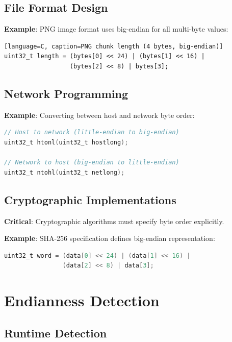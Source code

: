 \documentclass[11pt,a4paper]{article}
\begin{document}
\subsection{File Format Design}

\textbf{Example}: PNG image format uses big-endian for all multi-byte values:

\begin{lstlisting}[language=C, caption=PNG chunk length (4 bytes, big-endian)]
uint32_t length = (bytes[0] << 24) | (bytes[1] << 16) | 
                  (bytes[2] << 8) | bytes[3];
\end{lstlisting}

\subsection{Network Programming}

\textbf{Example}: Converting between host and network byte order:

\begin{lstlisting}[language=C, caption=Host and Network Byte Order Functions]
// Host to network (little-endian to big-endian)
uint32_t htonl(uint32_t hostlong);

// Network to host (big-endian to little-endian)
uint32_t ntohl(uint32_t netlong);
\end{lstlisting}

\subsection{Cryptographic Implementations}

\begin{warningbox}
\textbf{Critical}: Cryptographic algorithms must specify byte order explicitly.
\end{warningbox}

\textbf{Example}: SHA-256 specification defines big-endian representation:

\begin{lstlisting}[language=C, caption=Correct SHA-256 implementation (big-endian)]
uint32_t word = (data[0] << 24) | (data[1] << 16) | 
                (data[2] << 8) | data[3];
\end{lstlisting}

\section{Endianness Detection}

\subsection{Runtime Detection}
\end{document}
